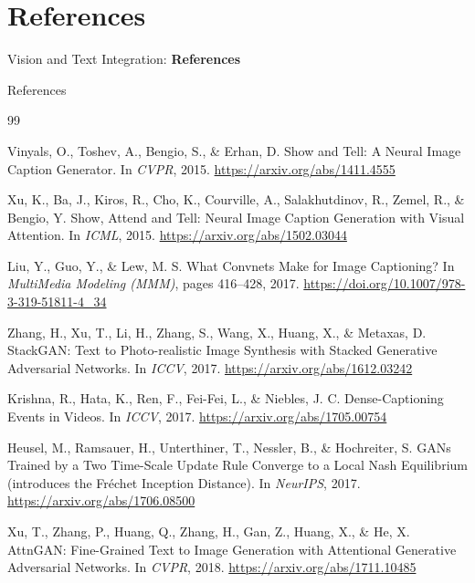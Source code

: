 \section{References}
\begin{frame}{}
    \LARGE Vision and Text Integration: \textbf{References}
\end{frame}

\begin{frame}[allowframebreaks]{References}
\begin{thebibliography}{99}

Vinyals, O., Toshev, A., Bengio, S., \& Erhan, D.
\newblock Show and Tell: A Neural Image Caption Generator.
\newblock In \emph{CVPR}, 2015.
\newblock \url{https://arxiv.org/abs/1411.4555}

Xu, K., Ba, J., Kiros, R., Cho, K., Courville, A., Salakhutdinov, R., Zemel, R., \& Bengio, Y.
\newblock Show, Attend and Tell: Neural Image Caption Generation with Visual Attention.
\newblock In \emph{ICML}, 2015.
\newblock \url{https://arxiv.org/abs/1502.03044}

Liu, Y., Guo, Y., \& Lew, M. S.
\newblock What Convnets Make for Image Captioning?
\newblock In \emph{MultiMedia Modeling (MMM)}, pages 416--428, 2017.
\newblock \url{https://doi.org/10.1007/978-3-319-51811-4_34}

Zhang, H., Xu, T., Li, H., Zhang, S., Wang, X., Huang, X., \& Metaxas, D.
\newblock StackGAN: Text to Photo-realistic Image Synthesis with Stacked Generative Adversarial Networks.
\newblock In \emph{ICCV}, 2017.
\newblock \url{https://arxiv.org/abs/1612.03242}

Krishna, R., Hata, K., Ren, F., Fei-Fei, L., \& Niebles, J. C.
\newblock Dense-Captioning Events in Videos.
\newblock In \emph{ICCV}, 2017.
\newblock \url{https://arxiv.org/abs/1705.00754}

Heusel, M., Ramsauer, H., Unterthiner, T., Nessler, B., \& Hochreiter, S.
\newblock GANs Trained by a Two Time-Scale Update Rule Converge to a Local Nash Equilibrium (introduces the Fr\'echet Inception Distance).
\newblock In \emph{NeurIPS}, 2017.
\newblock \url{https://arxiv.org/abs/1706.08500}

Xu, T., Zhang, P., Huang, Q., Zhang, H., Gan, Z., Huang, X., \& He, X.
\newblock AttnGAN: Fine-Grained Text to Image Generation with Attentional Generative Adversarial Networks.
\newblock In \emph{CVPR}, 2018.
\newblock \url{https://arxiv.org/abs/1711.10485}


\end{thebibliography}
\end{frame}
